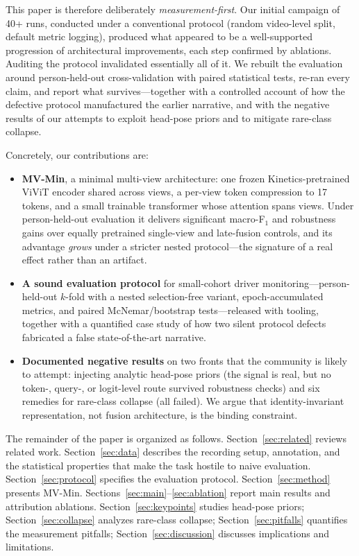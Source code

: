 \documentclass[journal]{IEEEtran}
\newcommand{\mF}{macro-F$_1$}
\newcommand{\mvmin}{MV-Min}
\begin{document}
This paper is therefore deliberately \emph{measurement-first}.  Our initial
campaign of 40+ runs, conducted under a conventional protocol (random
video-level split, default metric logging), produced what appeared to be a
well-supported progression of architectural improvements, each step
confirmed by ablations.  Auditing the protocol invalidated essentially all
of it.  We rebuilt the evaluation around person-held-out cross-validation
with paired statistical tests, re-ran every claim, and report what
survives---together with a controlled account of how the defective protocol
manufactured the earlier narrative, and with the negative results of our
attempts to exploit head-pose priors and to mitigate rare-class collapse.

Concretely, our contributions are:
\begin{itemize}
\item \textbf{\mvmin{}}, a minimal multi-view architecture: one frozen
Kinetics-pretrained ViViT encoder shared across views, a per-view token
compression to 17 tokens, and a small trainable transformer whose attention
spans views.  Under person-held-out evaluation it delivers significant
\mF{} and robustness gains over equally pretrained single-view and
late-fusion controls, and its advantage \emph{grows} under a stricter
nested protocol---the signature of a real effect rather than an artifact.
\item \textbf{A sound evaluation protocol} for small-cohort driver
monitoring---person-held-out $k$-fold with a nested selection-free variant,
epoch-accumulated metrics, and paired McNemar/bootstrap tests---released with
tooling, together with a quantified case study of how two silent protocol
defects fabricated a false state-of-the-art narrative.
\item \textbf{Documented negative results} on two fronts that the community
is likely to attempt: injecting analytic head-pose priors (the signal is
real, but no token-, query-, or logit-level route survived robustness
checks) and six remedies for rare-class collapse (all failed).  We argue
that identity-invariant representation, not fusion architecture, is the
binding constraint.
\end{itemize}

The remainder of the paper is organized as follows.
Section~\ref{sec:related} reviews related work.
Section~\ref{sec:data} describes the recording setup, annotation, and the
statistical properties that make the task hostile to naive evaluation.
Section~\ref{sec:protocol} specifies the evaluation protocol.
Section~\ref{sec:method} presents \mvmin.
Sections~\ref{sec:main}--\ref{sec:ablation} report main results and
attribution ablations.  Section~\ref{sec:keypoints} studies head-pose
priors; Section~\ref{sec:collapse} analyzes rare-class collapse;
Section~\ref{sec:pitfalls} quantifies the measurement pitfalls;
Section~\ref{sec:discussion} discusses implications and limitations.
\end{document}
